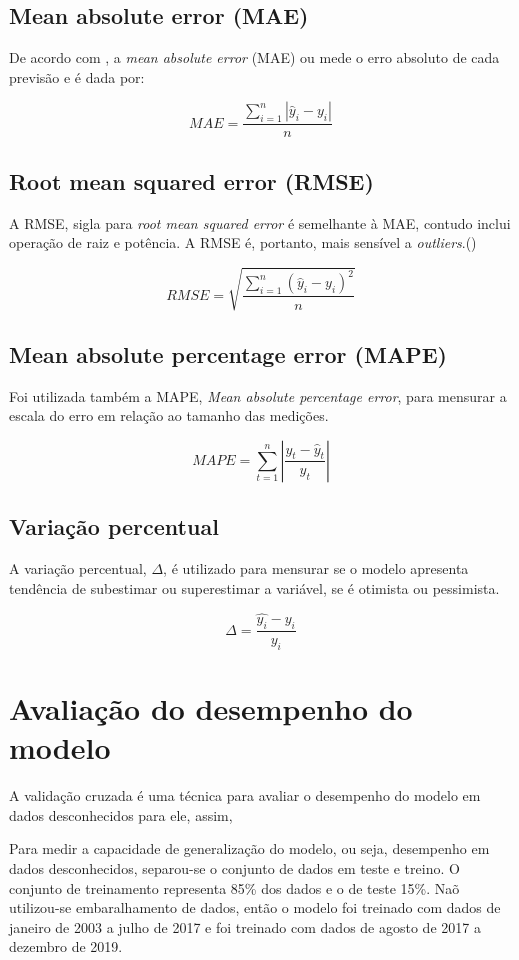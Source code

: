 \subsection{Mean absolute error (MAE)}

De acordo com \citet{forecast-evaluation-ds}, a
 \textit{mean absolute error} (MAE)
ou mede o erro absoluto de cada previsão
e é dada por:

\begin{equation}
    MAE = \frac{\sum_{i=1}^n |\hat{y}_i - y_i|}{n}
\end{equation}

\subsection{Root mean squared error (RMSE)}

A RMSE, sigla para \textit{root mean squared  error} é
semelhante à MAE, contudo inclui operação de raiz e potência. A RMSE é, portanto, 
mais sensível a \textit{outliers}.(\cite{forecast-evaluation-ds})

\begin{equation}
    RMSE = \sqrt{\frac{\sum_{i=1}^n (\hat{y}_i - y_i)^2}{n}}
\end{equation}

\subsection{Mean absolute percentage error (MAPE)}

Foi utilizada também a MAPE, \textit{Mean absolute
percentage error}, para mensurar a escala do erro em 
relação ao tamanho das medições.

\begin{equation}
    MAPE=\sum_{t=1}^n\left|\frac{y_t-\hat{y}_t}{y_t}\right|
\end{equation}

\subsection{Variação percentual}

A variação percentual, $\Delta$, é utilizado para mensurar se o 
modelo apresenta tendência de subestimar ou superestimar a variável, se 
é otimista ou pessimista.

\begin{equation}
    \Delta = \frac{\hat{y_i} - y_i}{y_i}
\end{equation}

\section{Avaliação do desempenho do modelo}

A validação cruzada é uma técnica para avaliar o desempenho do modelo 
em dados desconhecidos para ele, assim, 

Para medir a capacidade de generalização 
do modelo, ou seja, desempenho em dados desconhecidos, separou-se o 
conjunto de dados em teste e treino. O conjunto de treinamento representa 85\%
dos dados e o de teste 15\%. Naõ utilizou-se embaralhamento de dados, então o 
modelo foi treinado com dados de janeiro de 2003 a julho de 2017 e foi treinado 
com dados de agosto de 2017 a dezembro de 2019.